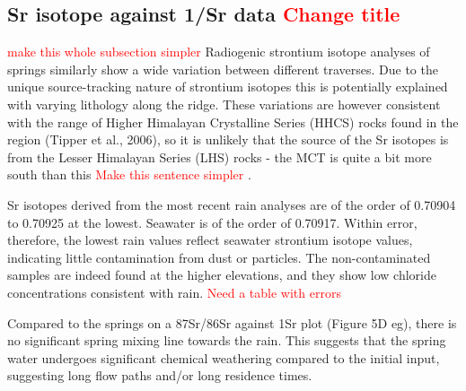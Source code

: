 
\newpage


\subsection{Sr isotope against 1/Sr data \textcolor{red}{Change title} }
\textcolor{red}{make this whole subsection simpler} 
Radiogenic strontium isotope analyses of springs similarly show a wide variation between different traverses. Due to the unique source-tracking nature of strontium isotopes this is potentially explained with varying lithology along the ridge. These variations are however consistent with the range of Higher Himalayan Crystalline Series (HHCS) rocks found in the region (Tipper et al., 2006), so it is unlikely that the source of the Sr isotopes is from the Lesser Himalayan Series (LHS) rocks - the MCT is quite a bit more south than this \textcolor{red}{Make this sentence simpler} .

\bsk

Sr isotopes derived from the most recent rain analyses are of the order of 0.70904 to 0.70925 at the lowest. Seawater is of the order of 0.70917. Within error, therefore, the lowest rain values reflect seawater strontium isotope values, indicating little contamination from dust or particles. The non-contaminated samples are indeed found at the higher elevations, and they show low chloride concentrations consistent with rain. \textcolor{red}{Need a table with errors} 

\bsk

Compared to the springs on a 87Sr/86Sr against 1Sr plot (Figure 5D eg), there is no significant spring mixing line towards the rain. This suggests that the spring water undergoes significant chemical weathering compared to the initial input, suggesting long flow paths and/or long residence times.



